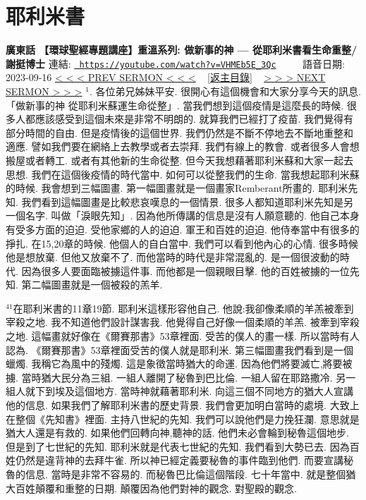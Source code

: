 \documentclass{book}
\begin{document}
\section{耶利米書}
\label{sec:VHMEb5E_3Qc}
\textbf{廣東話 【環球聖經專題講座】重溫系列: 做新事的神 — 從耶利米書看生命重整/謝挺博士}
\newline
\newline
連結: \href{https://youtube.com/watch?v=VHMEb5E_3Qc}{\texttt{ https://youtube.com/watch?v=VHMEb5E\_3Qc}} ~~~~ 語音日期: 2023-09-16 
\newline
\newline
\hyperref[sec:tuRWhEkvI_Q]{\small{< < < PREV SERMON < < <}}
~
\hyperref[sec:index]{\small{[返主目錄]}}
~
\hyperref[sec:Fxadxqj_2hA]{\small{> > > NEXT SERMON > > >}}
\newline
\newline
$^{1}$.
各位弟兄姊妹平安.
很開心有這個機會和大家分享今天的訊息.
「做新事的神 從耶利米蘇運生命從整」.
當我們想到這個疫情是這麼長的時候.
很多人都應該感受到這個未來是非常不明朗的.
就算我們已經打了疫苗.
我們覺得有部分時間的自由.
但是疫情後的這個世界.
我們仍然是不斷不停地去不斷地重整和適應.
譬如我們要在網絡上去教學或者去崇拜.
我們有線上的教會.
或者很多人會想搬屋或者轉工.
或者有其他新的生命從整.
但今天我想藉著耶利米蘇和大家一起去思想.
我們在這個後疫情的時代當中.
如何可以從整我們的生命.
當我想起耶利米蘇的時候.
我會想到三幅圖畫.
第一幅圖畫就是一個畫家Remberant所畫的.
耶利米先知.
我們看到這幅圖畫是比較悲哀嘆息的一個情景.
很多人都知道耶利米先知是另一個名字.
叫做「淚眼先知」.
因為他所傳講的信息是沒有人願意聽的.
他自己本身有受多方面的迫迫.
受他家鄉的人的迫迫.
軍王和百姓的迫迫.
他侍奉當中有很多的掙扎.
在15,20章的時候.
他個人的自白當中.
我們可以看到他內心的心情.
很多時候他是想放棄.
但他又放棄不了.
而他當時的時代是非常混亂的.
是一個很波動的時代.
因為很多人要面臨被擄這件事.
而他都是一個親眼目擊.
他的百姓被擄的一位先知.
第二幅圖畫就是一個被殺的羔羊.

$^{41}$在耶利米書的11章19節.
耶利米這樣形容他自己.
他說:我卻像柔順的羊羔被牽到宰殺之地.
我不知道他們設計謀害我.
他覺得自己好像一個柔順的羊羔.
被牽到宰殺之地.
這幅畫就好像在《爾賽那書》53章裡面.
受苦的僕人的畫一樣.
所以當時有人認為.
《爾賽那書》53章裡面受苦的僕人就是耶利米.
第三幅圖畫我們看到是一個蠟燭.
我稱它為風中的殘燭.
這是象徵當時猶大的命運.
因為他們將要滅亡,將要被擄.
當時猶大民分為三組.
一組人離開了秘魯到巴比倫.
一組人留在耶路撒冷.
另一組人就下到埃及這個地方.
當時神就藉著耶利米.
向這三個不同地方的猶大人宣講他的信息.
如果我們了解耶利米書的歷史背景.
我們會更加明白當時的處境.
大致上在整個《先知書》裡面.
主持八世紀的先知.
我們可以說他們是力挽狂瀾.
意思就是猶大人還是有救的.
如果他們回轉向神,聽神的話.
他們未必會輪到秘魯這個地步.
但是到了七世紀的先知.
耶利米就是代表七世紀的先知.
我們看到大勢已去.
因為百姓仍然是違背神的去拜牛雀.
所以神已經定義要秘魯的事件臨到他們.
而要宣講秘魯的信息.
當時是非常不容易的.
而秘魯巴比倫這個階段.
七十年當中.
就是整個猶大百姓顛覆和重整的日期.
顛覆因為他們對神的觀念.
對聖殿的觀念.
\end{document}
